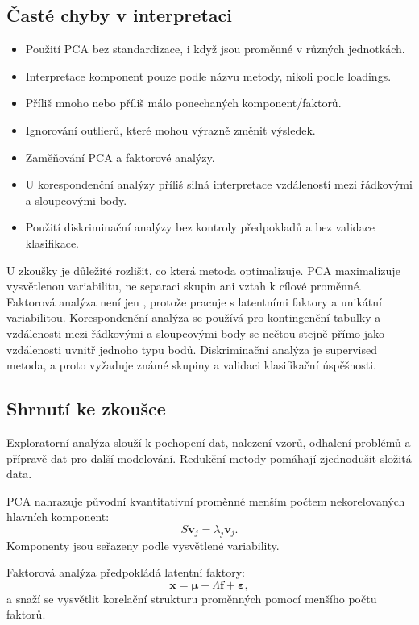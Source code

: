 \subsection{Časté chyby v interpretaci}

\begin{itemize}
    \item Použití PCA bez standardizace, i když jsou proměnné v různých jednotkách.
    \item Interpretace komponent pouze podle názvu metody, nikoli podle loadings.
    \item Příliš mnoho nebo příliš málo ponechaných komponent/faktorů.
    \item Ignorování outlierů, které mohou výrazně změnit výsledek.
    \item Zaměňování PCA a faktorové analýzy.
    \item U korespondenční analýzy příliš silná interpretace vzdáleností mezi řádkovými a sloupcovými body.
    \item Použití diskriminační analýzy bez kontroly předpokladů a bez validace klasifikace.
\end{itemize}

\pozor
U zkoušky je důležité rozlišit, co která metoda optimalizuje. PCA maximalizuje vysvětlenou variabilitu,
ne separaci skupin ani vztah k cílové proměnné. Faktorová analýza není jen ,
protože pracuje s latentními faktory a unikátní variabilitou. Korespondenční analýza se používá pro
kontingenční tabulky a vzdálenosti mezi řádkovými a sloupcovými body se nečtou stejně přímo jako
vzdálenosti uvnitř jednoho typu bodů. Diskriminační analýza je supervised metoda, a proto vyžaduje
známé skupiny a validaci klasifikační úspěšnosti.

\subsection{Shrnutí ke zkoušce}

Exploratorní analýza slouží k pochopení dat, nalezení vzorů, odhalení problémů a přípravě dat pro další
modelování. Redukční metody pomáhají zjednodušit složitá data.

PCA nahrazuje původní kvantitativní proměnné menším počtem nekorelovaných hlavních komponent:
\[
S\mathbf{v}_j=\lambda_j\mathbf{v}_j.
\]
Komponenty jsou seřazeny podle vysvětlené variability.

Faktorová analýza předpokládá latentní faktory:
\[
\mathbf{x}
=
\boldsymbol{\mu}
+
\Lambda \mathbf{f}
+
\boldsymbol{\varepsilon},
\]
a snaží se vysvětlit korelační strukturu proměnných pomocí menšího počtu faktorů.

